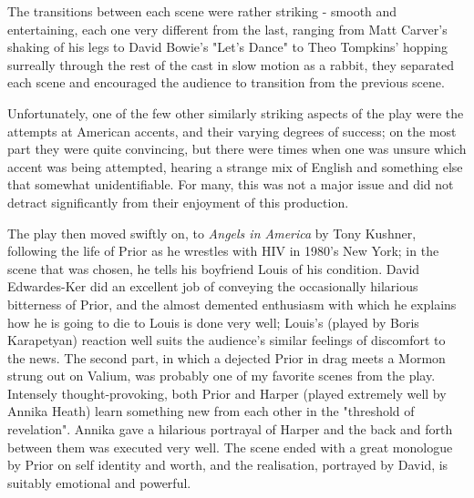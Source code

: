 \documentclass[11pt,a4paper]{report}
\begin{document}
\begin{multicols}{2}
The transitions between each scene were rather striking - smooth and
entertaining, each one very different from the last, ranging from Matt
Carver's shaking of his legs to David Bowie's "Let's Dance" to Theo
Tompkins' hopping surreally through the rest of the cast in slow motion
as a rabbit, they separated each scene and encouraged the audience to
transition from the previous scene.

Unfortunately, one of the few other similarly striking aspects of the
play were the attempts at American accents, and their varying degrees of
success; on the most part they were quite convincing, but there were
times when one was unsure which accent was being attempted, hearing a
strange mix of English and something else that somewhat unidentifiable.
For many, this was not a major issue and did not detract significantly
from their enjoyment of this production.

The play then moved swiftly on, to \textit{Angels in America} by Tony
Kushner, following the life of Prior as he wrestles with HIV in 1980's
New York; in the scene that was chosen, he tells his boyfriend Louis of
his condition. David Edwardes-Ker did an excellent job of conveying the
occasionally hilarious bitterness of Prior, and the almost demented
enthusiasm with which he explains how he is going to die to Louis is
done very well; Louis's (played by Boris Karapetyan) reaction well suits
the audience's similar feelings of discomfort to the news. The second
part, in which a dejected Prior in drag meets a Mormon strung out on
Valium, was probably one of my favorite scenes from the play. Intensely
thought-provoking, both Prior and Harper (played extremely well by
Annika Heath) learn something new from each other in the "threshold of
revelation". Annika gave a hilarious portrayal of Harper and the back
and forth between them was executed very well. The scene ended with a
great monologue by Prior on self identity and worth, and the
realisation, portrayed by David, is suitably emotional and powerful.


\end{multicols}
\end{document}
